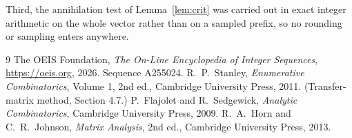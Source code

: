 \documentclass[11pt,a4paper]{article}
\theoremstyle{plain}
\theoremstyle{definition}
\begin{document}
Third, the annihilation test of Lemma~\ref{lem:crit} was carried out in exact integer
arithmetic on the whole vector rather than on a sampled prefix, so no rounding or sampling
enters anywhere.

\begin{thebibliography}{9}
 The OEIS Foundation, \emph{The On-Line Encyclopedia of Integer
Sequences}, \url{https://oeis.org}, 2026. Sequence A255024.
 R.~P.~Stanley, \emph{Enumerative Combinatorics}, Volume 1, 2nd ed.,
Cambridge University Press, 2011. (Transfer-matrix method, Section 4.7.)
 P.~Flajolet and R.~Sedgewick, \emph{Analytic Combinatorics}, Cambridge
University Press, 2009.
 R.~A.~Horn and C.~R.~Johnson, \emph{Matrix Analysis}, 2nd ed., Cambridge
University Press, 2013.
\end{thebibliography}
\end{document}
